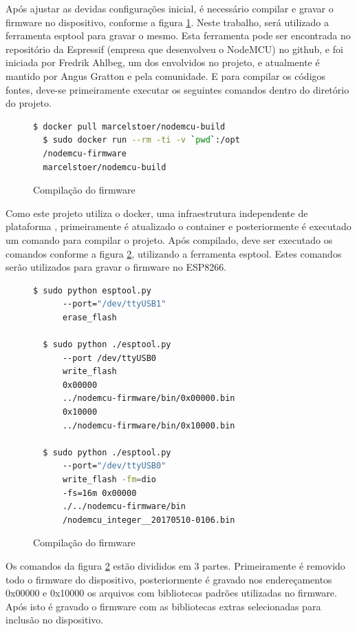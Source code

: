 \documentclass[journal]{IEEEtran}
\begin{document}
Após ajustar as devidas configurações inicial, é necessário compilar e gravar o firmware no dispositivo, conforme a figura \ref{alg:dockerpull}. Neste trabalho, será utilizado a ferramenta esptool para gravar o mesmo. Esta ferramenta pode ser encontrada no repositório da Espressif (empresa que desenvolveu o NodeMCU) no github, e foi iniciada por Fredrik Ahlbeg, um dos envolvidos no projeto, e atualmente é mantido por Angus Gratton e pela comunidade. E para compilar os códigos fontes, deve-se primeiramente executar os seguintes comandos dentro do diretório do projeto.

\begin{figure}[h]
\centering

\begin{lstlisting}[language=bash]
  $ docker pull marcelstoer/nodemcu-build
  $ sudo docker run --rm -ti -v `pwd`:/opt
  /nodemcu-firmware 
  marcelstoer/nodemcu-build
\end{lstlisting}

\caption{Compilação do firmware}
\label{alg:dockerpull}
\end{figure}


Como este projeto utiliza o docker, uma infraestrutura independente de plataforma \cite{dockeroque}, primeiramente é atualizado o container e posteriormente é executado um comando para compilar o projeto. 
Após compilado, deve ser executado os comandos conforme a figura \ref{alg:esptool1}, utilizando a ferramenta esptool. Estes comandos serão utilizados para gravar o firmware no ESP8266. 


\begin{figure}[H]
\centering

\begin{lstlisting}[language=bash]
  $ sudo python esptool.py 
      --port="/dev/ttyUSB1" 
      erase_flash

  $ sudo python ./esptool.py 
      --port /dev/ttyUSB0 
      write_flash 
      0x00000 
      ../nodemcu-firmware/bin/0x00000.bin 
      0x10000 
      ../nodemcu-firmware/bin/0x10000.bin

  $ sudo python ./esptool.py 
      --port="/dev/ttyUSB0" 
      write_flash -fm=dio 
      -fs=16m 0x00000 
      ./../nodemcu-firmware/bin
      /nodemcu_integer__20170510-0106.bin
\end{lstlisting}

\caption{Compilação do firmware}
\label{alg:esptool1}
\end{figure}


Os comandos da figura \ref{alg:esptool1} estão divididos em 3 partes. Primeiramente é removido todo o firmware do dispositivo, posteriormente é gravado nos endereçamentos 0x00000 e 0x10000 os arquivos com bibliotecas padrões utilizadas no firmware. Após isto é gravado o firmware com as bibliotecas extras selecionadas para inclusão no dispositivo.
\end{document}
